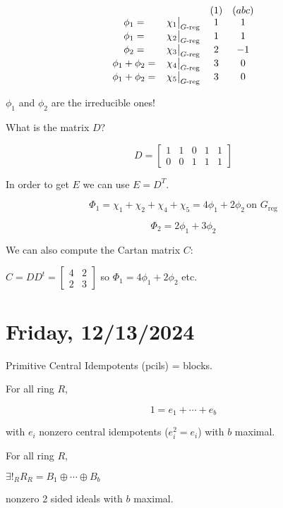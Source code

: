 \documentclass{article}
\theoremstyle{definition}
\begin{document}
\[
    \begin{matrix}
        & & (1) & (abc) \\
        \phi_1 =& \eval{\chi_1}_{G\text{-reg}} & 1 & 1\\
        \phi_1 =& \eval{\chi_2}_{G\text{-reg}} & 1 & 1\\
        \phi_2 =& \eval{\chi_3}_{G\text{-reg}} & 2 & -1 \\
        \phi_1 + \phi_2 =& \eval{\chi_4}_{G\text{-reg}} & 3 & 0\\
        \phi_1 + \phi_2 =&\eval{\chi_5}_{G\text{-reg}} & 3 & 0

    \end{matrix}
\]

\(\phi_1\) and \(\phi_2\) are the irreducible ones!

What is the matrix \(D\)?

\[
    D = \begin{bmatrix}
        1 & 1 & 0 & 1 & 1 \\ 0 & 0 & 1 & 1 & 1
    \end{bmatrix}
\]

In order to get \(E\) we can use \(E = D^T\).

\[
    \Phi_1 = \chi_1 + \chi_2 + \chi_4 + \chi_5 = 4 \phi_1 + 2 \phi_2 \, \text{on } G_{\text{reg}}
\]

\[
    \Phi_2 = 2\phi_1 + 3 \phi_2
\]

We can also compute the Cartan matrix \(C\):


\(C = D D^t = \begin{bmatrix}
    4 & 2 \\ 2 & 3
\end{bmatrix}\) so \(\Phi_1 = 4 \phi_1 + 2 \phi_2\) etc.

\section*{Friday, 12/13/2024}

Primitive Central Idempotents (pcils) = blocks.

For all ring \(R\),

\[
    1 = e_1 + \cdots + e_b
\]

with \(e_i\) nonzero central idempotents (\(e_i^2 = e_i\)) with \(b\) maximal.

For all ring \(R\),

\(\exists ! _R R _R = B_1 \oplus \cdots \oplus B_b\) 

nonzero 2 sided ideals with \(b\) maximal.
\end{document}
